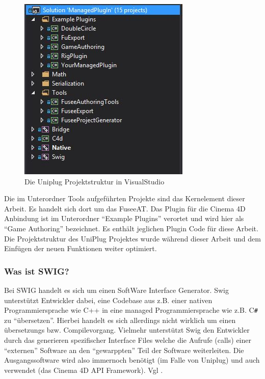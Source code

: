 \documentclass[pagesize, paper=a4, fontsize=12pt, titlepage=true, headings=small, headnosepline, abstractoff, liststotoc, nochapterprefix, plainheadsepline, twoside]{scrreprt}
\newcommand{\CSS}{C\texttt{\# }}
\begin{document}
\begin{figure}[ht]
	\centering
  \includegraphics[width=\linewidth / 2]{Bilder/UniplugVSStruktur.JPG}
	\caption{Die Uniplug Projektstruktur in VisualStudio}
	\label{UniPlugVSStruktur}
\end{figure}
Die im Unterordner Tools aufgeführten Projekte sind das Kernelement dieser Arbeit. Es handelt sich dort um das FuseeAT. Das Plugin für die Cinema 4D Anbindung ist im Unterordner “Example Plugins” verortet und wird hier als “Game Authoring” bezeichnet. Es enthält jeglichen Plugin Code für diese Arbeit. Die Projektstruktur des UniPlug Projektes wurde während dieser Arbeit und dem Einfügen der neuen Funktionen weiter optimiert.

\subsubsection{Was ist SWIG?}
Bei SWIG handelt es sich um einen SoftWare Interface Generator. Swig unterstützt Entwickler dabei, eine Codebase aus z.B. einer nativen Programmiersprache wie C++ in eine managed Programmiersprache wie z.B. \CSS zu “übersetzen”. Hierbei handelt es sich allerdings nicht wirklich um einen übersetzungs bzw. Compilevorgang. Vielmehr unterstützt Swig den Entwickler durch das generieren spezifischer Interface Files welche die Aufrufe (calls) einer “externen” Software an den “gewarppten” Teil der Software weiterleiten. Die Ausgangssoftware wird also immernoch benötigt (im Falle von Uniplug) und auch verwendet (das Cinema 4D API Framework). Vgl .
\end{document}

